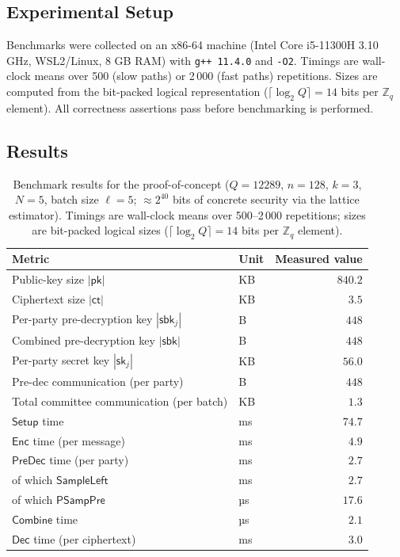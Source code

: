 \subsection{Experimental Setup}

Benchmarks were collected on an x86-64 machine (Intel Core i5-11300H \@ 3.10 GHz,
WSL2/Linux, 8 GB RAM) with \texttt{g++ 11.4.0} and \texttt{-O2}.
Timings are wall-clock means over 500 (slow paths) or 2\,000 (fast paths) repetitions.
Sizes are computed from the bit-packed logical representation
($\lceil\log_2 Q\rceil=14$ bits per $\mathbb{Z}_q$ element).
All correctness assertions pass before benchmarking is performed.

\subsection{Results}

\begin{table}[h]
\centering
\renewcommand{\arraystretch}{1.25}
\begin{tabular}{|l|l|r|}
\hline
\textbf{Metric} & \textbf{Unit} & \textbf{Measured value} \\
\hline
Public-key size $|\mathsf{pk}|$                    & KB  & $840.2$ \\
\hline
Ciphertext size $|\mathsf{ct}|$                    & KB  & $3.5$ \\
\hline
Per-party pre-decryption key $|\mathsf{sbk}_j|$    & B   & $448$ \\
\hline
Combined pre-decryption key $|\mathsf{sbk}|$       & B   & $448$ \\
\hline
Per-party secret key $|\mathsf{sk}_j|$             & KB  & $56.0$ \\
\hline
Pre-dec communication (per party)                   & B   & $448$ \\
\hline
Total committee communication (per batch)           & KB  & $1.3$ \\
\hline
\hline
$\mathsf{Setup}$ time                              & ms  & $74.7$ \\
\hline
$\mathsf{Enc}$ time (per message)                  & ms  & $4.9$ \\
\hline
$\mathsf{PreDec}$ time (per party)                 & ms  & $2.7$ \\
\hline
\quad of which $\mathsf{SampleLeft}$               & ms  & $2.7$ \\
\hline
\quad of which $\mathsf{PSampPre}$                 & µs  & $17.6$ \\
\hline
$\mathsf{Combine}$ time                            & µs  & $2.1$ \\
\hline
$\mathsf{Dec}$ time (per ciphertext)               & ms  & $3.0$ \\
\hline
\end{tabular}
\caption{Benchmark results for the proof-of-concept ($Q=12289$, $n=128$, $k=3$, $N=5$,
batch size $\ell=5$; $\approx 2^{40}$ bits of concrete security via the lattice estimator).
Timings are wall-clock means over 500--2\,000 repetitions; sizes are bit-packed logical
sizes ($\lceil\log_2 Q\rceil=14$ bits per $\mathbb{Z}_q$ element).}
\label{tab:eval-metrics}
\end{table}


